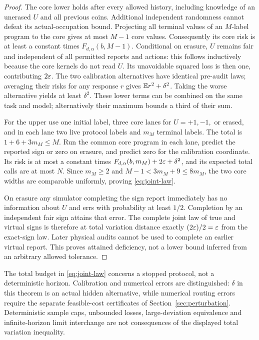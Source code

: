 \begin{proof}
The core lower holds after every allowed history, including knowledge of an unerased $U$ and all previous coins. Additional independent randomness cannot defeat its actual-occupation bound. Projecting all terminal values of an $M$-label program to the core gives at most $M-1$ core values. Consequently its core risk is at least a constant times $F_{d,\alpha}(b,M-1)$. Conditional on erasure, $U$ remains fair and independent of all permitted reports and actions: this follows inductively because the core kernels do not read $U$. Its unavoidable squared loss is then one, contributing $2\varepsilon$. The two calibration alternatives have identical pre-audit laws; averaging their risks for any response $r$ gives $\mathbb E r^2+\delta^2$. Taking the worse alternative yields at least $\delta^2$. These lower terms can be combined on the same task and model; alternatively their maximum bounds a third of their sum.

For the upper use one initial label, three core lanes for $U=+1,-1,$ or erased, and in each lane two live protocol labels and $m_M$ terminal labels. The total is $1+6+3m_M\le M$. Run the common core program in each lane, predict the reported sign or zero on erasure, and predict zero for the calibration coordinate. Its risk is at most a constant times $F_{d,\alpha}(b,m_M)+2\varepsilon+\delta^2$, and its expected total calls are at most $N$. Since $m_M\ge2$ and $M-1<3m_M+9\le8m_M$, the two core widths are comparable uniformly, proving \eqref{eq:joint-law}.

On erasure any simulator completing the sign report immediately has no information about $U$ and errs with probability at least $1/2$. Completion by an independent fair sign attains that error. The complete joint law of true and virtual signs is therefore at total variation distance exactly $(2\varepsilon)/2=\varepsilon$ from the exact-sign law. Later physical audits cannot be used to complete an earlier virtual report. This proves attained deficiency, not a lower bound inferred from an arbitrary allowed tolerance.
\end{proof}

The total budget in \eqref{eq:joint-law} concerns a stopped protocol, not a deterministic horizon. Calibration and numerical errors are distinguished: $\delta$ in this theorem is an actual hidden alternative, while numerical routing errors require the separate feasible-cost certificates of Section~\ref{sec:perturbation}. Deterministic sample caps, unbounded losses, large-deviation equivalence and infinite-horizon limit interchange are not consequences of the displayed total variation inequality.

